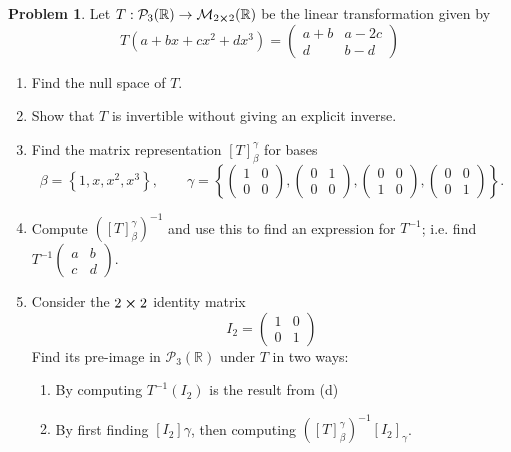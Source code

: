 \documentclass[10pt]{article}
\theoremstyle{definition}
\newtheorem{problem}{Problem}
\begin{document}
\begin{problem}
Let $T:\mathcal{P}_3(\mathbb{R})\to\mathcal{M}_{2\cross 2}(\mathbb{R})$ be the linear transformation given by
$$T(a+bx+cx^2+dx^3)=\begin{pmatrix}
    a+b & a-2c \\
    d   & b-d
  \end{pmatrix}$$
\begin{enumerate}[label=(\alph*)]
  \item Find the null space of $T$.
  \item Show that $T$ is invertible without giving an explicit inverse.
  \item Find the matrix representation $\left[T\right]_\beta^\gamma$ for bases
        $$\beta=\left\{1,x,x^2,x^3\right\},\qquad \gamma=\left\{
          \begin{pmatrix}
            1 & 0 \\
            0 & 0
          \end{pmatrix},
          \begin{pmatrix}
            0 & 1 \\
            0 & 0
          \end{pmatrix},
          \begin{pmatrix}
            0 & 0 \\
            1 & 0
          \end{pmatrix},
          \begin{pmatrix}
            0 & 0 \\
            0 & 1
          \end{pmatrix}
          \right\}.$$
  \item Compute $\left(\left[T\right]_\beta^\gamma\right)^{-1}$ and use this to find an expression for $T^{-1}$; i.e. find $T^{-1}\begin{pmatrix}
            a & b \\
            c & d
          \end{pmatrix}$.
  \item Consider the $2\cross 2$ identity matrix
        $$I_2=\begin{pmatrix}
            1 & 0 \\
            0 & 1
          \end{pmatrix}$$
        Find its pre-image in $\mathcal{P}_3(\mathbb{R})$ under $T$ in two ways:
        \begin{enumerate}[label=(\roman*)]
          \item By computing $T^{-1}(I_2)$ is the result from (d)
          \item By first finding $\left[I_2\right]\gamma$, then computing $\left(\left[T\right]_\beta^\gamma\right)^{-1}\left[I_2\right]_\gamma$.
        \end{enumerate}
\end{enumerate}
\end{problem}
\end{document}
